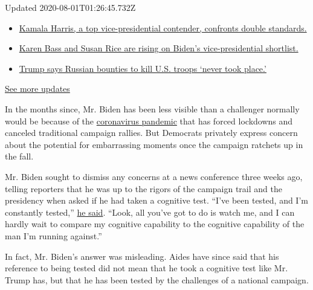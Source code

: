 Updated 2020-08-01T01:26:45.732Z

\begin{itemize}
\tightlist
\item
  \href{https://www.nytimes.com/2020/07/31/us/elections/biden-vs-trump.html?action=click\&pgtype=Article\&state=default\&region=MAIN_CONTENT_1\&context=storylines_live_updates\#link-29fdff45}{Kamala
  Harris, a top vice-presidential contender, confronts double
  standards.}
\item
  \href{https://www.nytimes.com/2020/07/31/us/elections/biden-vs-trump.html?action=click\&pgtype=Article\&state=default\&region=MAIN_CONTENT_1\&context=storylines_live_updates\#link-13ec3d9c}{Karen
  Bass and Susan Rice are rising on Biden's vice-presidential
  shortlist.}
\item
  \href{https://www.nytimes.com/2020/07/31/us/elections/biden-vs-trump.html?action=click\&pgtype=Article\&state=default\&region=MAIN_CONTENT_1\&context=storylines_live_updates\#link-49e9a016}{Trump
  says Russian bounties to kill U.S. troops `never took place.'}
\end{itemize}

\href{https://www.nytimes.com/2020/07/31/us/elections/biden-vs-trump.html?action=click\&pgtype=Article\&state=default\&region=MAIN_CONTENT_1\&context=storylines_live_updates}{See
more updates}

In the months since, Mr. Biden has been less visible than a challenger
normally would be because of the
\href{https://www.nytimes.com/interactive/2020/us/coronavirus-us-cases.html}{coronavirus
pandemic} that has forced lockdowns and canceled traditional campaign
rallies. But Democrats privately express concern about the potential for
embarrassing moments once the campaign ratchets up in the fall.

Mr. Biden sought to dismiss any concerns at a news conference three
weeks ago, telling reporters that he was up to the rigors of the
campaign trail and the presidency when asked if he had taken a cognitive
test. ``I've been tested, and I'm constantly tested,''
\href{https://www.foxnews.com/politics/biden-eager-to-compare-cognitive-ability-against-trumps}{he
said}. ``Look, all you've got to do is watch me, and I can hardly wait
to compare my cognitive capability to the cognitive capability of the
man I'm running against.''

In fact, Mr. Biden's answer was misleading. Aides have since said that
his reference to being tested did not mean that he took a cognitive test
like Mr. Trump has, but that he has been tested by the challenges of a
national campaign.

